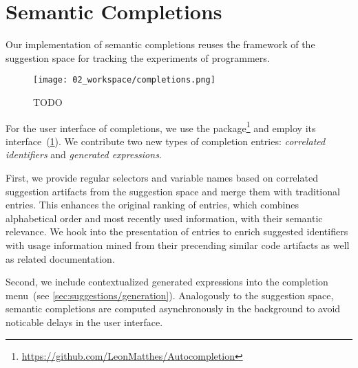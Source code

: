 
\section{Semantic Completions}
\label{sec:implementation/completions}

Our implementation of semantic completions reuses the framework of the suggestion space for tracking the experiments of programmers.

\begin{figure}
	\centering
	\texttt{[image: 02\_workspace/completions.png]}
	\caption[TODO]{
		TODO
	}
	\label{fig:implementation/completions}
\end{figure}

For the user interface of completions, we use the  package\footnote{\url{https://github.com/LeonMatthes/Autocompletion}} and employ its  interface~(\cref{fig:implementation/completions}).
We contribute two new types of completion entries: \emph{correlated identifiers} and \emph{generated expressions}.

First, we provide regular selectors and variable names based on correlated suggestion artifacts from the suggestion space and merge them with traditional  entries.
This enhances the original ranking of entries, which combines alphabetical order and most recently used information, with their semantic relevance.
We hook into the presentation of entries to enrich suggested identifiers with usage information mined from their precending similar code artifacts as well as related documentation.

Second, we include contextualized generated expressions into the completion menu~(see \cref{sec:suggestions/generation}).
Analogously to the suggestion space, semantic completions are computed asynchronously in the background to avoid noticable delays in the user interface.